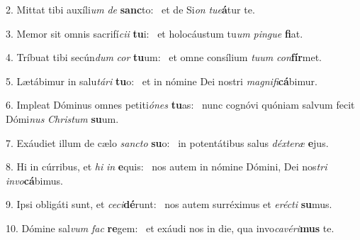2. Mittat tibi auxíli\textit{um} \textit{de} \textbf{sanc}to: \ast\  et de Si\textit{on} \textit{tu}\textit{e}\textbf{á}tur te.\

3. Memor sit omnis sacrifí\textit{ci}\textit{i} \textbf{tu}i: \ast\  et holocáustum tu\textit{um} \textit{pin}\textit{gue} \textbf{fi}at.\

4. Tríbuat tibi secún\textit{dum} \textit{cor} \textbf{tu}um: \ast\  et omne consílium \textit{tu}\textit{um} \textit{con}\textbf{fír}met.\

5. Lætábimur in salu\textit{tá}\textit{ri} \textbf{tu}o: \ast\  et in nómine Dei nostri \textit{ma}\textit{gni}\textit{fi}\textbf{cá}bimur.\

6. Impleat Dóminus omnes petiti\textit{ó}\textit{nes} \textbf{tu}as: \ast\  nunc cognóvi quóniam salvum fecit Dómi\textit{nus} \textit{Chris}\textit{tum} \textbf{su}um.\

7. Exáudiet illum de cælo \textit{sanc}\textit{to} \textbf{su}o: \ast\  in potentátibus salus \textit{déx}\textit{te}\textit{ræ} \textbf{e}jus.\

8. Hi in cúrribus, et \textit{hi} \textit{in} \textbf{e}quis: \ast\  nos autem in nómine Dómini, Dei nos\textit{tri} \textit{in}\textit{vo}\textbf{cá}bimus.\

9. Ipsi obligáti sunt, et \textit{ce}\textit{ci}\textbf{dé}runt: \ast\  nos autem surréximus et \textit{e}\textit{réc}\textit{ti} \textbf{su}mus.\

10. Dómine sal\textit{vum} \textit{fac} \textbf{re}gem: \ast\  et exáudi nos in die, qua invo\textit{ca}\textit{vé}\textit{ri}\textbf{mus} te.\

